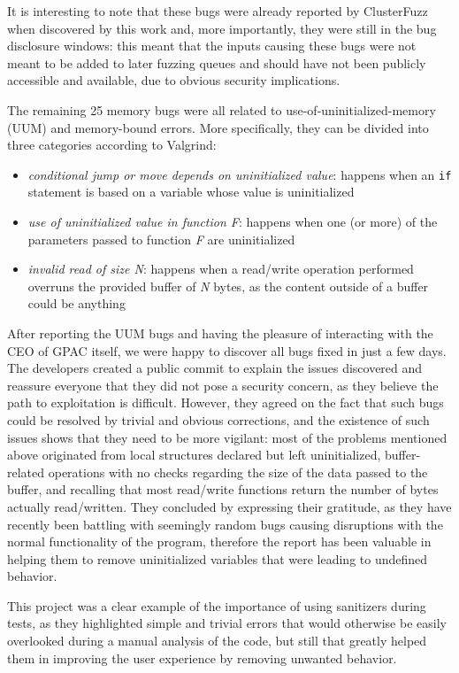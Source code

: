 It is interesting to note that these bugs were already reported by ClusterFuzz when discovered by this work and, more importantly, they were still in the bug disclosure windows: this meant that the inputs causing these bugs were not meant to be added to later fuzzing queues and should have not been publicly accessible and available, due to obvious security implications.

The remaining 25 memory bugs were all related to use-of-uninitialized-memory (UUM) and memory-bound errors. More specifically, they can be divided into three categories according to Valgrind:
\begin{itemize}
    \item \textit{conditional jump or move depends on uninitialized value}: happens when an \verb|if| statement is based on a variable whose value is uninitialized
    \item \textit{use of uninitialized value in function F}: happens when one (or more) of the parameters passed to  function \textit{F} are uninitialized
    \item \textit{invalid read of size N}: happens when a read/write operation performed overruns the provided buffer of \textit{N} bytes, as the content outside of a buffer could be anything
\end{itemize}

After reporting the UUM bugs and having the pleasure of interacting with the CEO of GPAC itself, we were happy to discover all bugs fixed in just a few days. The developers created a public commit \cite{gpac_commit} to explain the issues discovered and reassure everyone that they did not pose a security concern, as they believe the path to exploitation is difficult. However, they agreed on the fact that such bugs could be resolved by trivial and obvious corrections, and the existence of such issues shows that they need to be more vigilant: most of the problems mentioned above originated from local structures declared but left uninitialized, buffer-related operations with no checks regarding the size of the data passed to the buffer, and recalling that most read/write functions return the number of bytes actually read/written.
They concluded by expressing their gratitude, as they have recently been battling with seemingly random bugs causing disruptions with the normal functionality of the program, therefore the report has been valuable in helping them to remove uninitialized variables that were leading to undefined behavior.

This project was a clear example of the importance of using sanitizers during tests, as they highlighted simple and trivial errors that would otherwise be easily overlooked during a manual analysis of the code, but still that greatly helped them in improving the user experience by removing unwanted behavior.









